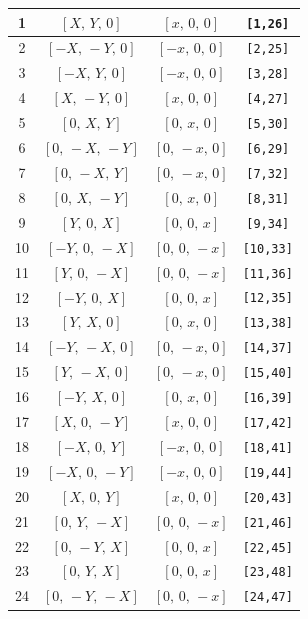 \documentclass[fleqn,8pt]{jsarticle}
\begin{document}
\begin{longtable}{cccc}
1 & $\left[ X,\, Y,\, 0 \right]$ & $\left[ x,\, 0,\, 0 \right]$ & {\tt [1,26]} \\ \hline
2 & $\left[ - X,\, - Y,\, 0 \right]$ & $\left[ - x,\, 0,\, 0 \right]$ & {\tt [2,25]} \\ \hline
3 & $\left[ - X,\, Y,\, 0 \right]$ & $\left[ - x,\, 0,\, 0 \right]$ & {\tt [3,28]} \\ \hline
4 & $\left[ X,\, - Y,\, 0 \right]$ & $\left[ x,\, 0,\, 0 \right]$ & {\tt [4,27]} \\ \hline
5 & $\left[ 0,\, X,\, Y \right]$ & $\left[ 0,\, x,\, 0 \right]$ & {\tt [5,30]} \\ \hline
6 & $\left[ 0,\, - X,\, - Y \right]$ & $\left[ 0,\, - x,\, 0 \right]$ & {\tt [6,29]} \\ \hline
7 & $\left[ 0,\, - X,\, Y \right]$ & $\left[ 0,\, - x,\, 0 \right]$ & {\tt [7,32]} \\ \hline
8 & $\left[ 0,\, X,\, - Y \right]$ & $\left[ 0,\, x,\, 0 \right]$ & {\tt [8,31]} \\ \hline
9 & $\left[ Y,\, 0,\, X \right]$ & $\left[ 0,\, 0,\, x \right]$ & {\tt [9,34]} \\ \hline
10 & $\left[ - Y,\, 0,\, - X \right]$ & $\left[ 0,\, 0,\, - x \right]$ & {\tt [10,33]} \\ \hline
11 & $\left[ Y,\, 0,\, - X \right]$ & $\left[ 0,\, 0,\, - x \right]$ & {\tt [11,36]} \\ \hline
12 & $\left[ - Y,\, 0,\, X \right]$ & $\left[ 0,\, 0,\, x \right]$ & {\tt [12,35]} \\ \hline
13 & $\left[ Y,\, X,\, 0 \right]$ & $\left[ 0,\, x,\, 0 \right]$ & {\tt [13,38]} \\ \hline
14 & $\left[ - Y,\, - X,\, 0 \right]$ & $\left[ 0,\, - x,\, 0 \right]$ & {\tt [14,37]} \\ \hline
15 & $\left[ Y,\, - X,\, 0 \right]$ & $\left[ 0,\, - x,\, 0 \right]$ & {\tt [15,40]} \\ \hline
16 & $\left[ - Y,\, X,\, 0 \right]$ & $\left[ 0,\, x,\, 0 \right]$ & {\tt [16,39]} \\ \hline
17 & $\left[ X,\, 0,\, - Y \right]$ & $\left[ x,\, 0,\, 0 \right]$ & {\tt [17,42]} \\ \hline
18 & $\left[ - X,\, 0,\, Y \right]$ & $\left[ - x,\, 0,\, 0 \right]$ & {\tt [18,41]} \\ \hline
19 & $\left[ - X,\, 0,\, - Y \right]$ & $\left[ - x,\, 0,\, 0 \right]$ & {\tt [19,44]} \\ \hline
20 & $\left[ X,\, 0,\, Y \right]$ & $\left[ x,\, 0,\, 0 \right]$ & {\tt [20,43]} \\ \hline
21 & $\left[ 0,\, Y,\, - X \right]$ & $\left[ 0,\, 0,\, - x \right]$ & {\tt [21,46]} \\ \hline
22 & $\left[ 0,\, - Y,\, X \right]$ & $\left[ 0,\, 0,\, x \right]$ & {\tt [22,45]} \\ \hline
23 & $\left[ 0,\, Y,\, X \right]$ & $\left[ 0,\, 0,\, x \right]$ & {\tt [23,48]} \\ \hline
24 & $\left[ 0,\, - Y,\, - X \right]$ & $\left[ 0,\, 0,\, - x \right]$ & {\tt [24,47]} \\
\end{longtable}
\end{document}
